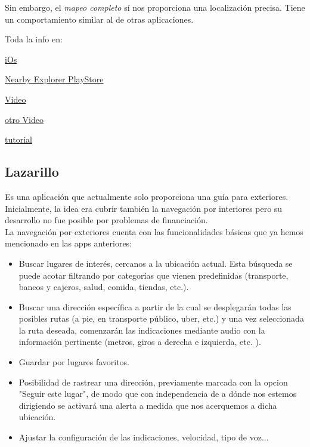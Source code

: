\documentclass{article}
\begin{document}
	Sin embargo, el \textit{mapeo completo} sí nos proporciona una localización precisa. Tiene un comportamiento similar al de otras aplicaciones.
	
	Toda la info en:
	
	\textcolor{blue}{\href{https://developer.apple.com/accessibility/ios}{iOs}}
	
	\textcolor{blue}{\href{	https://play.google.com/store/apps/details?id=org.aph.nearbyonline&hl=es}{Nearby Explorer PlayStore}}
	
	\textcolor{blue}{\href{https://www.youtube.com/watch?v=Vlc0Pjv4Qro}{Video}}
	
	\textcolor{blue}{\href{https://www.youtube.com/watch?v=f2zE_yEL1Og}{ otro Video}}
	
	\textcolor{blue}{\href{https://www.youtube.com/watch?v=I_cJcOl5MPE}{tutorial}}
	
	\subsection{Lazarillo}
	Es una aplicación que actualmente solo proporciona una guía para exteriores. Inicialmente, la idea era cubrir también la navegación por interiores pero su desarrollo no fue posible por problemas de financiación.
	\\
	La navegación por exteriores cuenta con las funcionalidades básicas que ya hemos mencionado en las apps anteriores: \begin{itemize}
	
	\item Buscar lugares de interés, cercanos a la ubicación actual. Esta búsqueda se puede acotar filtrando por categorías que vienen predefinidas (transporte, bancos y cajeros, salud, comida, tiendas, etc.).
	
	\item Buscar una dirección específica a partir de la cual se desplegarán todas las posibles rutas (a pie, en transporte público, uber, etc.) y una vez seleccionada la ruta deseada, comenzarán las indicaciones mediante audio con la información pertinente (metros, giros a derecha e izquierda, etc. ). 
	
	\item Guardar por lugares favoritos.
	
	\item Posibilidad de rastrear una dirección, previamente marcada con la opcion "Seguir este lugar", de modo que con independencia de a dónde nos estemos dirigiendo se activará una alerta a medida que nos acerquemos a dicha ubicación.
	
	\item Ajustar la configuración de las indicaciones, velocidad, tipo de voz...
	\end{itemize}
	
\end{document}
